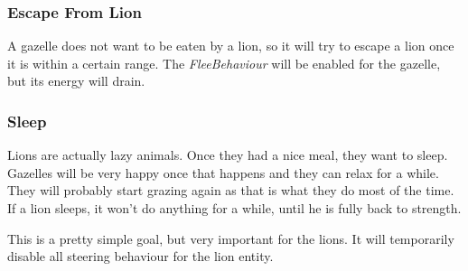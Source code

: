 \subsubsection{Escape From Lion}\label{sec:behaviourEscape}
A gazelle does not want to be eaten by a lion, so it will try to escape a lion once it is within a certain range.
The \textit{FleeBehaviour} will be enabled for the gazelle, but its energy will drain.

\subsubsection{Sleep}\label{sec:behaviourSleep}
Lions are actually lazy animals.
Once they had a nice meal, they want to sleep.
Gazelles will be very happy once that happens and they can relax for a while.
They will probably start grazing again as that is what they do most of the time.
If a lion sleeps, it won't do anything for a while, until he is fully back to strength.

This is a pretty simple goal, but very important for the lions.
It will temporarily disable all steering behaviour for the lion entity.

